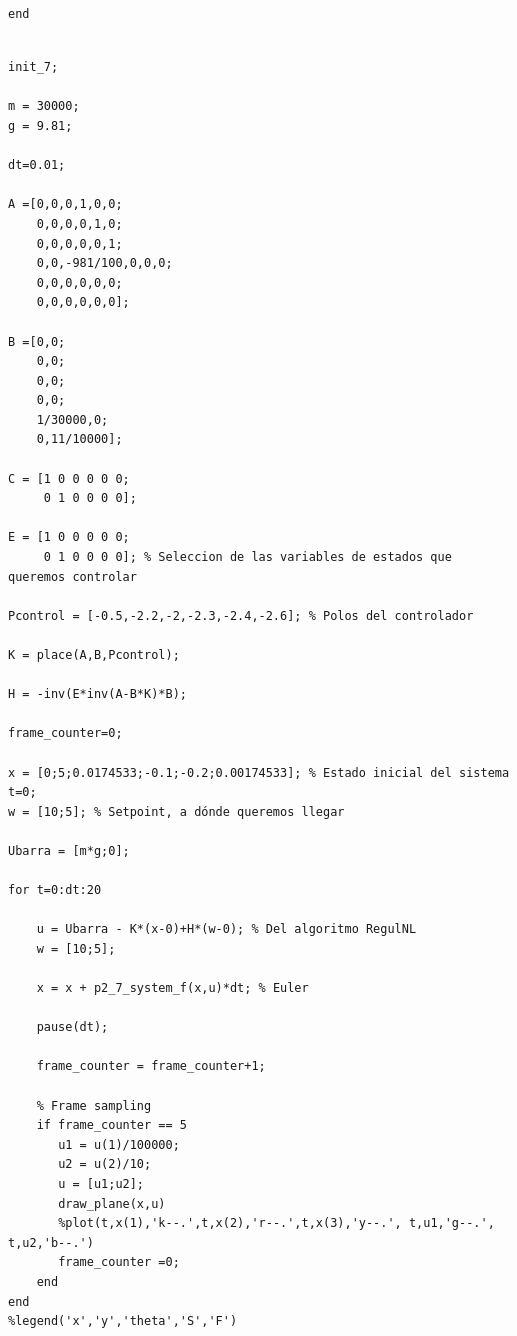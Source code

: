 \documentclass{article}
\begin{document}
\begin{itemize}
\begin{tcolorbox}
\begin{scriptsize}
\begin{verbatim}
end

\end{verbatim}
\end{scriptsize}
\end{tcolorbox}


\begin{tcolorbox}
[
title={File \texttt{answer\_7\_main.m}}      
]
\begin{scriptsize}
\begin{verbatim}

init_7;

m = 30000;
g = 9.81;

dt=0.01;

A =[0,0,0,1,0,0;
    0,0,0,0,1,0;
    0,0,0,0,0,1;
    0,0,-981/100,0,0,0;
    0,0,0,0,0,0;
    0,0,0,0,0,0];

B =[0,0;
    0,0;
    0,0;
    0,0;
    1/30000,0;
    0,11/10000];

C = [1 0 0 0 0 0;
     0 1 0 0 0 0];

E = [1 0 0 0 0 0;
     0 1 0 0 0 0]; % Seleccion de las variables de estados que queremos controlar

Pcontrol = [-0.5,-2.2,-2,-2.3,-2.4,-2.6]; % Polos del controlador

K = place(A,B,Pcontrol);

H = -inv(E*inv(A-B*K)*B);

frame_counter=0;

x = [0;5;0.0174533;-0.1;-0.2;0.00174533]; % Estado inicial del sistema
t=0;
w = [10;5]; % Setpoint, a dónde queremos llegar

Ubarra = [m*g;0];

for t=0:dt:20

    u = Ubarra - K*(x-0)+H*(w-0); % Del algoritmo RegulNL
    w = [10;5];

    x = x + p2_7_system_f(x,u)*dt; % Euler
    
    pause(dt);
    
    frame_counter = frame_counter+1;
    
    % Frame sampling
    if frame_counter == 5
       u1 = u(1)/100000;
       u2 = u(2)/10;
       u = [u1;u2];
       draw_plane(x,u)
       %plot(t,x(1),'k--.',t,x(2),'r--.',t,x(3),'y--.', t,u1,'g--.', t,u2,'b--.')
       frame_counter =0;
    end
end
%legend('x','y','theta','S','F')

\end{verbatim}
\end{scriptsize}
\end{tcolorbox}


\end{itemize}
\end{document}
